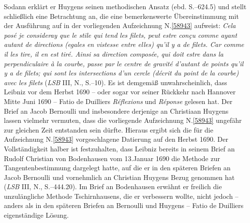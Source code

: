 Sodann erklärt er Huygens seinen methodischen Ansatz (ebd. S.--624.5)\cite{01506} und stellt schließlich eine Betrachtung an, die eine bemerkenswerte Übereinstimmung mit der Ausführung auf  in der vorliegenden Aufzeichnung N.\;\ref{58943} aufweist: \textit{Cela posé je consideray que le stile qui tend les filets, peut estre conçu comme ayant autant de directions (egales en vistesse entre elles) qu'il y a de filets. Car comme il les tire, il en est tiré. Ainsi sa direction composée, qui doit estre dans la perpendiculaire à la courbe, passe par le centre de gravité d’autant de points qu’il y a de filets; qui sont les intersections d'un cercle (décrit du point de la courbe) avec les filets} (\textit{LSB} III, N., S.--10).\cite{01506}
Es ist demgemäß unwahrscheinlich, dass Leibniz vor dem Herbst 1690 -- oder sogar vor seiner Rückkehr nach Hannover Mitte Juni 1690 -- Fatio de Duilliers \textit{Réflexions}\cite{02539} und \textit{Réponse}\cite{02540} gelesen hat.
Der Brief an Jacob Bernoulli\cite{01260} und insbesondere derjenige an Christiaan Huygens\cite{01506} lassen vielmehr vermuten, dass die vorliegende Aufzeichnung N.\;\ref{58943} ungefähr zur gleichen Zeit entstanden sein dürfte.
Hieraus ergibt sich die für die Aufzeichnung N.\;\ref{58943} vorgeschlagene Datierung auf den Herbst 1690.
\pend%
\pstart%
Der Vollständigkeit halber ist festzuhalten, dass Leibniz bereits in seinem Brief an Rudolf Christian von Bodenhausen vom 13.\;Januar 1690 die Methode zur Tangentenbestimmung dargelegt hatte, auf die er in den späteren Briefen an Jacob Bernoulli\cite{01260} und vornehmlich an Christian Huygens\cite{01506} Bezug genommen hat (\textit{LSB} III, N., S.--444.20)\cite{01385}.
Im Brief an Bodenhausen erwähnt er freilich die unzulängliche Methode Tschirnhausens, die er verbessern wollte, nicht jedoch -- anders als in den späteren Briefen an Bernoulli\cite{01260} und Huygens\cite{01506} -- Fatio de Duilliers eigenständige Lösung.
